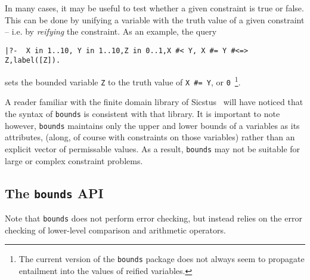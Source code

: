 In many cases, it may be useful to test whether a given constraint is
true or false.  This can be done by unifying a variable with the truth
value of a given constraint -- i.e.  by {\em reifying} the constraint.
As an example, the query
%
{\small
\begin{verbatim}
|?-  X in 1..10, Y in 1..10,Z in 0..1,X #< Y, X #= Y #<=> Z,label([Z]).
\end{verbatim}
}
%
\noindent
sets the bounded variable {\tt Z} to the truth value of {\tt X \#= Y},
or {\tt 0}~\footnote{The current version of the {\tt bounds} package
  does not always seem to propagate entailment into the values of
  reified variables.}.

A reader familiar with the finite domain library of
Sicstus~\cite{sicstus-manual} will have noticed that the syntax of
{\tt bounds} is consistent with that library.  It is important to note
however, {\tt bounds} maintains only the upper and lower bounds of a
variables as its attributes, (along, of course with constraints on
those variables) rather than an explicit vector of permissable values.
As a result, {\tt bounds} may not be suitable for large or complex
constraint problems.

\subsection{The {\tt bounds} API}

Note that {\tt bounds} does not perform error checking, but instead
relies on the error checking of lower-level comparison and arithmetic
operators.


